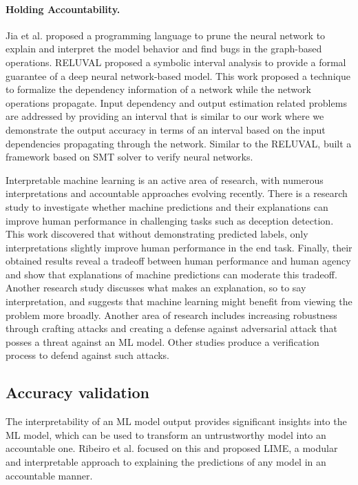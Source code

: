 \paragraph{Holding Accountability.}
Jia et al. \cite{jia2019taso} proposed a programming language to prune the neural network to explain and interpret the model behavior and find bugs in the graph-based operations. RELUVAL \cite{wang2018formal} proposed a symbolic interval analysis to provide a formal guarantee of a deep neural network-based model. This work proposed a technique to formalize the dependency information of a network while the network operations propagate. Input dependency and output estimation related problems are addressed by providing an interval that is similar to our work where we demonstrate the output accuracy in terms of an interval based on the input dependencies propagating through the network. Similar to the RELUVAL, \cite{katz2017reluplex} built a framework based on SMT solver to verify neural networks.

Interpretable machine learning is an active area of research, with numerous interpretations and accountable approaches evolving recently. There is a research study \cite{lai2018human} to investigate whether machine predictions and their explanations can improve human performance in challenging tasks such as deception detection. This work discovered that without demonstrating predicted labels, only interpretations slightly improve human performance in the end task. Finally, their obtained results reveal a tradeoff between human performance and human agency and show that explanations of machine predictions can moderate this tradeoff. Another research study \cite{yang2019learn} discusses what makes an explanation, so to say interpretation, and suggests that machine learning might benefit from viewing the problem more broadly. Another area of research includes increasing robustness through crafting attacks and creating a defense against adversarial attack \cite{papernot2016towards}  that posses a threat against an ML model. Other studies  \cite{anderson2019optimization,pan2019static} produce a verification process to defend against such attacks.

\subsection{\textbf{Accuracy validation}}
The interpretability of an ML model output provides significant insights into the ML model, which can be used to transform an untrustworthy model into an accountable one. Ribeiro et al. \cite{ribeiro2016should} focused on this and proposed LIME, a modular and interpretable approach to explaining the predictions of any model in an accountable manner. 

